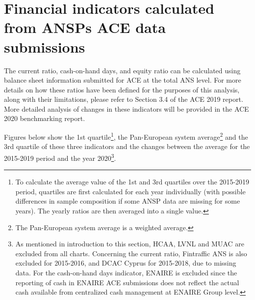 \documentclass[
]{book}
\begin{document}
\begin{infobox}
\begin{right}
\end{right}

\end{infobox}

\hypertarget{covid_2}{%
\section{Financial indicators calculated from ANSPs ACE data
submissions}\label{covid_2}}

The current ratio, cash-on-hand days, and equity ratio can be calculated
using balance sheet information submitted for ACE at the total ANS
level. For more details on how these ratios have been defined for the
purposes of this analysis, along with their limitations, please refer to
Section 3.4 of the ACE 2019 report. More detailed analysis of changes in
these indicators will be provided in the ACE 2020 benchmarking report.

Figures below show the 1st quartile\footnote{To calculate the average
  value of the 1st and 3rd quartiles over the 2015-2019 period,
  quartiles are first calculated for each year individually (with
  possible differences in sample composition if some ANSP data are
  missing for some years). The yearly ratios are then averaged into a
  single value.}, the Pan-European system average\footnote{The
  Pan-European system average is a weighted average.} and the 3rd
quartile of these three indicators and the changes between the average
for the 2015-2019 period and the year 2020\footnote{As mentioned in
  introduction to this section, HCAA, LVNL and MUAC are excluded from
  all charts. Concerning the current ratio, Fintraffic ANS is also
  excluded for 2015-2016, and DCAC Cyprus for 2015-2018, due to missing
  data. For the cash-on-hand days indicator, ENAIRE is excluded since
  the reporting of cash in ENAIRE ACE submissions does not reflect the
  actual cash available from centralized cash management at ENAIRE Group
  level.}.
\end{document}
